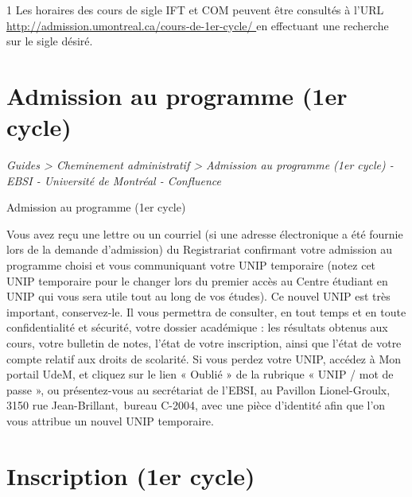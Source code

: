 \documentclass [12 pt]{article}
\begin{document}
            
            1 Les horaires des cours de sigle IFT et COM peuvent être consultés à
                l'URL 
        \href{
        http://admission.umontreal.ca/cours-de-1er-cycle/
        } {
        http://admission.umontreal.ca/cours-de-1er-cycle/
        }
     en effectuant une
                recherche sur le sigle désiré.
        
    
    
        \newpage
        \section {
        Admission au programme (1er cycle)
        }
        
        
        
        \textit{
        Guides > Cheminement administratif > Admission au programme (1er cycle) - EBSI
            - Université de Montréal - Confluence
        }
    
        Admission au programme (1er cycle)
        
            Vous avez reçu une lettre ou un courriel (si une adresse électronique a été fournie
                lors de la demande d'admission) du Registrariat confirmant votre admission au
                programme choisi et vous communiquant votre UNIP temporaire (notez cet
                    UNIP temporaire pour le changer lors du premier accès au Centre
                étudiant en UNIP qui vous sera utile tout au long de vos études). Ce nouvel
                    UNIP est très important, conservez-le. Il vous permettra de consulter,
                en tout temps et en toute confidentialité et sécurité, votre dossier académique :
                les résultats obtenus aux cours, votre bulletin de notes, l'état de votre
                inscription, ainsi que l'état de votre compte relatif aux droits de scolarité.
            Si vous perdez votre UNIP, accédez à Mon portail UdeM, et cliquez sur le
                lien « Oublié » de la rubrique « UNIP / mot de passe », ou
                présentez-vous au secrétariat de l'EBSI, au Pavillon Lionel-Groulx, 3150 rue
                Jean-Brillant, bureau C-2004, avec une pièce d'identité afin que l'on vous
                attribue un nouvel UNIP temporaire.
        
    
    
        \newpage
        \section {
        Inscription (1er cycle)
        }
        
\end{document}

